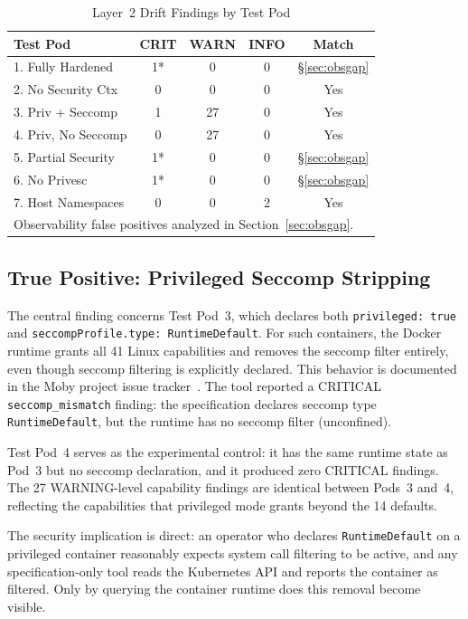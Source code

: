 \documentclass[conference]{IEEEtran}
\begin{document}
\begin{table}[htbp]
\caption{Layer~2 Drift Findings by Test Pod}
\label{tab:results}
\centering
\begin{tabular}{lcccc}
\toprule
\textbf{Test Pod} & \textbf{CRIT} & \textbf{WARN} & \textbf{INFO} & \textbf{Match} \\
\midrule
1. Fully Hardened   & 1*  & 0  & 0 & \S\ref{sec:obsgap} \\
2. No Security Ctx  & 0   & 0  & 0 & Yes \\
3. Priv + Seccomp   & 1   & 27 & 0 & Yes \\
4. Priv, No Seccomp & 0   & 27 & 0 & Yes \\
5. Partial Security & 1*  & 0  & 0 & \S\ref{sec:obsgap} \\
6. No Privesc       & 1*  & 0  & 0 & \S\ref{sec:obsgap} \\
7. Host Namespaces  & 0   & 0  & 2 & Yes \\
\bottomrule
\multicolumn{5}{l}{\footnotesize *Observability false positives analyzed in Section~\ref{sec:obsgap}.}
\end{tabular}
\end{table}

\subsection{True Positive: Privileged Seccomp Stripping}

The central finding concerns Test Pod~3, which declares both \texttt{privileged: true} and \texttt{seccompProfile.type: RuntimeDefault}. For such containers, the Docker runtime grants all 41 Linux capabilities and removes the seccomp filter entirely, even though seccomp filtering is explicitly declared. This behavior is documented in the Moby project issue tracker~\cite{moby41321}. The tool reported a CRITICAL \texttt{seccomp\_mismatch} finding: the specification declares seccomp type \texttt{RuntimeDefault}, but the runtime has no seccomp filter (unconfined).

Test Pod~4 serves as the experimental control: it has the same runtime state as Pod~3 but no seccomp declaration, and it produced zero CRITICAL findings. The 27 WARNING-level capability findings are identical between Pods~3 and~4, reflecting the capabilities that privileged mode grants beyond the 14 defaults.

The security implication is direct: an operator who declares \texttt{RuntimeDefault} on a privileged container reasonably expects system call filtering to be active, and any specification-only tool reads the Kubernetes API and reports the container as filtered. Only by querying the container runtime does this removal become visible.
\end{document}
